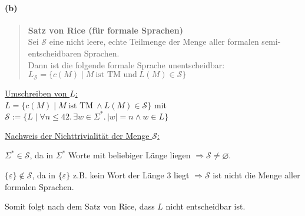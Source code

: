	\vspace{0.3cm}

\paragraph{(b)}
	\begin{quote}	
		\textbf{Satz von Rice (für formale Sprachen)}\\
		Sei $\mathcal{S} $ eine nicht leere, echte Teilmenge der Menge aller formalen semi-entscheidbaren Sprachen.\\
		Dann ist die folgende formale Sprache unentscheidbar:\\
		$L_\mathcal{S}  = \{c(M) \mid M\ \text{ist TM und}\ L(M) \in \mathcal{S}\}$
	\end{quote}
	
	\underline{Umschreiben von $L$:}\\
	$L=\{c(M) \mid M\ \text{ist TM}\ \land L(M) \in \mathcal{S}\}$ mit $\mathcal{S} := \{L \mid \forall n \leq 42.\, \exists w \in \Sigma^*.\, |w|=n \land w \in L\}$

	\underline{Nachweis der Nichttrivialität der Menge $\mathcal{S}$:}

	$\Sigma^* \in \mathcal{S}$, da in $\Sigma^*$ Worte mit beliebiger Länge liegen $\Rightarrow \mathcal{S} \neq \varnothing$.

	$\{\varepsilon\} \notin \mathcal{S}$, da in $\{\varepsilon\}$ z.B. kein Wort der Länge 3 liegt $\Rightarrow \mathcal{S}$ ist nicht die Menge aller formalen Sprachen.

	Somit folgt nach dem Satz von Rice, dass $L$ nicht entscheidbar ist.